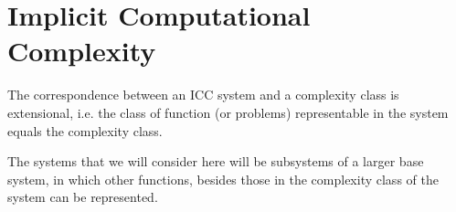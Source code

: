 \chapter{Implicit Computational Complexity}





The correspondence between an ICC system and a complexity class is extensional,
i.e. the class of function (or problems) representable in the system equals the
complexity class.


The systems that we will consider here will be subsystems of a larger base
system, in which other functions, besides those in the complexity class of the
system can be represented.
